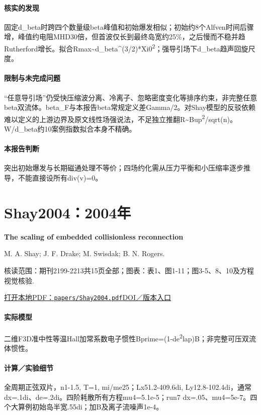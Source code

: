 \paragraph{核实的发现}固定d\_beta时跨四个数量级beta峰值和初始爆发相似；初始约8个Alfven时间后骤增，峰值约电阻MHD30倍，但首波仅长到最终岛宽约25\%，之后慢而不稳并趋Rutherford增长。拟合Rmax\textasciitilde{}d\_beta\textasciicircum{}(3/2)*Xi0\textsuperscript{2}；强导引场下d\_beta趋声回旋尺度。

\paragraph{限制与未完成问题}“任意导引场”仍受快压缩波分离、冷离子、忽略密度变化等排序约束，非完整任意beta双流体。beta\_F与本报告beta常规定义差Gamma/2。对Shay模型的反驳依赖难以定义的上游边界及原文线性场强说法，不足独立推翻R\textasciitilde{}Bup\textsuperscript{2}/sqrt(n)。W/d\_beta约10案例指数拟合本身不精确。

\paragraph{本报告判断}突出初始爆发与长期磁通处理不等价；四场约化需从压力平衡和小压缩率逐步推导，不能直接设所有div(v)=0。

\section{Shay2004：2004年}\label{paper:Shay2004}

\textbf{The scaling of embedded collisionless reconnection}\citep{Shay2004}\

M. A. Shay;  J. F. Drake;  M. Swisdak;  B. N. Rogers.

\textsf{核读范围：}期刊2199-2213共15页全部；\textsf{图表：}表1、图1-11；图3-5、8、10及方程视觉核验.

\href{run:papers/Shay2004.pdf}{打开本地PDF：\texttt{papers/Shay2004.pdf}}\quad\href{https://doi.org/10.1063/1.1705650}{DOI／版本入口}

\paragraph{实际模型}二维F3D准中性等温Hall加常系数电子惯性Bprime=(1-de\textsuperscript{2}lap)B；非完整可压双流体惯性。

\paragraph{计算／实验细节}全周期正弦双片，n1-1.5, T=1, mi/me25；Lx51.2-409.6di, Ly12.8-102.4di，通常dx=.1di、de=.2di。四阶耗散所有方程mu4=5.1e-5；run7 dx=.05、mu4=5e-7。四个大算例初始岛半宽.55di；加B及离子流噪声1e-4。

